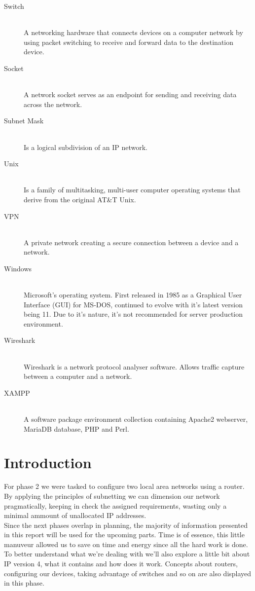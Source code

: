 \documentclass[11pt,a4paper]{report}
\begin{document}
\begin{description}
        \item[Switch] \hfill \\
            A networking hardware that connects devices on a computer network by using packet switching to receive and forward data to the destination device.
        \item[Socket] \hfill \\
            A network socket serves as an endpoint for sending and receiving data across the network.
        \item[Subnet Mask] \hfill \\
            Is a logical subdivision of an IP network.
        \item[Unix] \hfill \\
            Is a family of multitasking, multi-user computer operating systems that derive from the original AT\&T Unix.
        \item[VPN] \hfill \\
            A private network creating a secure connection between a device and a network.
        \item[Windows] \hfill \\
            Microsoft's operating system. First released in 1985 as a Graphical User Interface (GUI) for MS-DOS, continued to evolve with it's latest version being 11.
            Due to it's nature, it's not recommended for server production environment.
        \item[Wireshark] \hfill \\
            Wireshark is a network protocol analyser software. Allows traffic capture between a computer and a network.
        \item[XAMPP] \hfill \\
            A software package environment collection containing Apache2 webserver, MariaDB database, PHP and Perl.
    \end{description}

\chapter{Introduction}
    \pagestyle{fancy}
    For phase 2 we were tasked to configure two local area networks using a router. By applying the principles of subnetting we can dimension our network pragmatically, keeping in check the assigned requirements, wasting only a minimal ammount of unallocated IP addresses.\\
    Since the next phases overlap in planning, the majority of information presented in this report will be used for the upcoming parts. Time is of essence, this little manuveur allowed us to save on time and energy since all the hard work is done.\\
    To better understand what we're dealing with we'll also explore a little bit about IP version 4, what it contains and how does it work. Concepts about routers, configuring our devices, taking advantage of switches and so on are also displayed in this phase.\\
\end{document}
